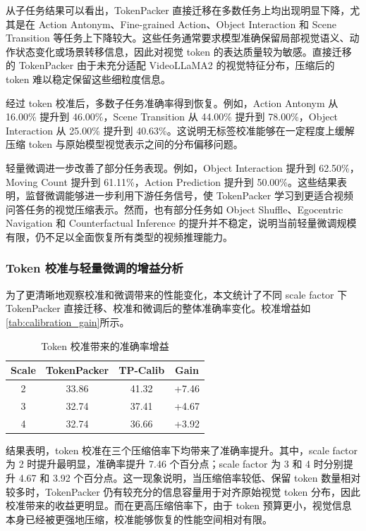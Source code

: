 从子任务结果可以看出，TokenPacker 直接迁移在多数任务上均出现明显下降，尤其是在 Action Antonym、Fine-grained Action、Object Interaction 和 Scene Transition 等任务上下降较大。这些任务通常要求模型准确保留局部视觉语义、动作状态变化或场景转移信息，因此对视觉 token 的表达质量较为敏感。直接迁移的 TokenPacker 由于未充分适配 VideoLLaMA2 的视觉特征分布，压缩后的 token 难以稳定保留这些细粒度信息。

经过 token 校准后，多数子任务准确率得到恢复。例如，Action Antonym 从 16.00\% 提升到 46.00\%，Scene Transition 从 44.00\% 提升到 78.00\%，Object Interaction 从 25.00\% 提升到 40.63\%。这说明无标签校准能够在一定程度上缓解压缩 token 与原始模型视觉表示之间的分布偏移问题。

轻量微调进一步改善了部分任务表现。例如，Object Interaction 提升到 62.50\%，Moving Count 提升到 61.11\%，Action Prediction 提升到 50.00\%。这些结果表明，监督微调能够进一步利用下游任务信号，使 TokenPacker 学习到更适合视频问答任务的视觉压缩表示。然而，也有部分任务如 Object Shuffle、Egocentric Navigation 和 Counterfactual Inference 的提升并不稳定，说明当前轻量微调规模有限，仍不足以全面恢复所有类型的视频推理能力。

\subsubsection{Token 校准与轻量微调的增益分析}

为了更清晰地观察校准和微调带来的性能变化，本文统计了不同 scale factor 下 TokenPacker 直接迁移、校准和微调后的整体准确率变化。校准增益如\autoref{tab:calibration_gain}所示。

\begin{table}[!htbp]
    \centering
    \caption{\label{tab:calibration_gain}Token 校准带来的准确率增益}
    \begin{tabular}{c c c c}
        \toprule
        Scale & TokenPacker & TP-Calib & Gain \\
        \midrule
        2 & 33.86 & 41.32 & +7.46 \\
        3 & 32.74 & 37.41 & +4.67 \\
        4 & 32.74 & 36.66 & +3.92 \\
        \bottomrule
    \end{tabular}
\end{table}

结果表明，token 校准在三个压缩倍率下均带来了准确率提升。其中，scale factor 为 2 时提升最明显，准确率提升 7.46 个百分点；scale factor 为 3 和 4 时分别提升 4.67 和 3.92 个百分点。这一现象说明，当压缩倍率较低、保留 token 数量相对较多时，TokenPacker 仍有较充分的信息容量用于对齐原始视觉 token 分布，因此校准带来的收益更明显。而在更高压缩倍率下，由于 token 预算更小，视觉信息本身已经被更强地压缩，校准能够恢复的性能空间相对有限。


